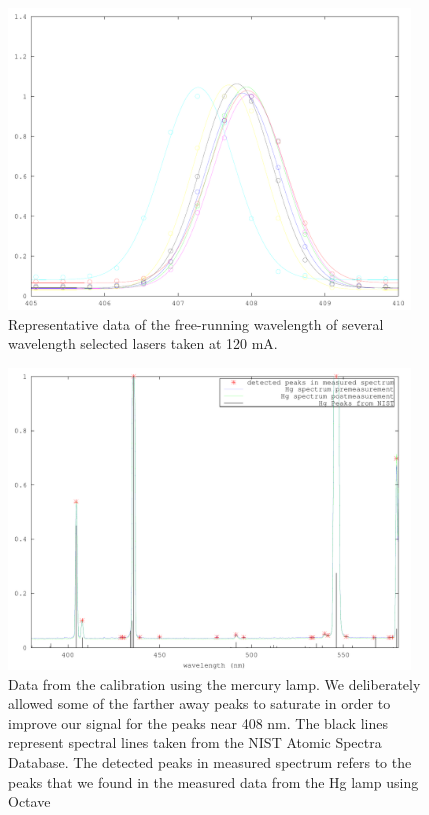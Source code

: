 \begin{figure}
\centering
\includegraphics[width=0.95\textwidth]{wavelength_selected} 
\caption[Wavelength selected diodes]{\label{wavelengthselected} Representative data of the free-running wavelength of several wavelength selected lasers taken at 120 mA.} %
\end{figure}
\begin{figure}
\centering
\includegraphics[width=0.95\textwidth]{calibrationData} 
\caption[Calibration spectrum from Hg Lamp]{\label{calibrationData} Data from the calibration using the mercury lamp. We deliberately allowed some of the farther away peaks to saturate in order to improve our signal for the peaks near 408 nm. The black lines represent spectral lines taken from the NIST Atomic Spectra Database\cite{NISTasd}. The detected peaks in measured spectrum refers to the peaks that we found in the measured data from the Hg lamp using Octave}
\end{figure}

